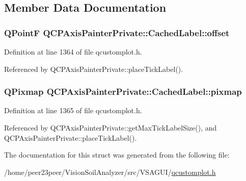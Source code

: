 \subsection{Member Data Documentation}
\hypertarget{struct_q_c_p_axis_painter_private_1_1_cached_label_a5f502db71c92e572f1e6f44f62c59d8e}{}
\subsubsection[{offset}]{\setlength{\rightskip}{0pt plus 5cm}Q\+Point\+F Q\+C\+P\+Axis\+Painter\+Private\+::\+Cached\+Label\+::offset}\label{struct_q_c_p_axis_painter_private_1_1_cached_label_a5f502db71c92e572f1e6f44f62c59d8e}


Definition at line 1364 of file qcustomplot.\+h.



Referenced by Q\+C\+P\+Axis\+Painter\+Private\+::place\+Tick\+Label().

\hypertarget{struct_q_c_p_axis_painter_private_1_1_cached_label_a461597cbd470914a9d24b64d16037a88}{}
\subsubsection[{pixmap}]{\setlength{\rightskip}{0pt plus 5cm}Q\+Pixmap Q\+C\+P\+Axis\+Painter\+Private\+::\+Cached\+Label\+::pixmap}\label{struct_q_c_p_axis_painter_private_1_1_cached_label_a461597cbd470914a9d24b64d16037a88}


Definition at line 1365 of file qcustomplot.\+h.



Referenced by Q\+C\+P\+Axis\+Painter\+Private\+::get\+Max\+Tick\+Label\+Size(), and Q\+C\+P\+Axis\+Painter\+Private\+::place\+Tick\+Label().



The documentation for this struct was generated from the following file\+:\begin{DoxyCompactItemize}
\item 
/home/peer23peer/\+Vision\+Soil\+Analyzer/src/\+V\+S\+A\+G\+U\+I/\hyperlink{qcustomplot_8h}{qcustomplot.\+h}\end{DoxyCompactItemize}
